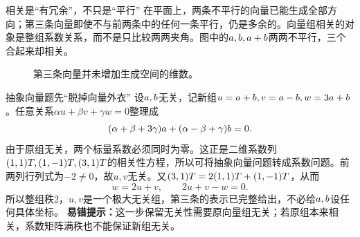 \begin{insight}{相关是“有冗余”，不只是“平行”}
在平面上，两条不平行的向量已能生成全部方向；第三条向量即使不与前两条中的任何一条平行，仍是多余的。向量组相关的对象是整组系数关系，而不是只比较两两夹角。图中的$a,b,a+b$两两不平行，三个合起来却相关。
\end{insight}
\begin{figure}[H]\centering
{}
\caption{第三条向量并未增加生成空间的维数。}\label{fig:dependent-vectors}
\end{figure}
\begin{clevertrick}{抽象向量题先“脱掉向量外衣”}
设$a,b$无关，记新组$u=a+b,v=a-b,w=3a+b$。任意关系$\alpha u+\beta v+\gamma w=0$整理成
\[(\alpha+\beta+3\gamma)a+(\alpha-\beta+\gamma)b=0.\]
由于原组无关，两个标量系数必须同时为零。这正是二维系数列$(1,1)T,(1,-1)T,(3,1)T$的相关性方程，所以可将抽象向量问题转成系数问题。前两列行列式为$-2\ne0$，故$u,v$无关。又$(3,1)T=2(1,1)T+(1,-1)T$，从而
\[w=2u+v,\qquad 2u+v-w=0.\]
所以整组秩2，$u,v$是一个极大无关组，第三条的表示已完整给出，不必给$a,b$设任何具体坐标。
\textbf{易错提示：}这一步保留无关性需要原向量组无关；若原组本来相关，系数矩阵满秩也不能保证新组无关。
\end{clevertrick}
